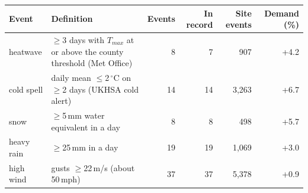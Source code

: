 \begin{tabular}{lp{6.2cm}rrrr}
\toprule
Event & Definition & Events & In record & Site events & Demand (\%) \\
\midrule
heatwave & $\geq$3 days with $T_{max}$ at or above the county threshold (Met Office) & 8 & 7 & 907 & +4.2 \\
cold spell & daily mean $\leq$2\,$^\circ$C on $\geq$2 days (UKHSA cold alert) & 14 & 14 & 3,263 & +6.7 \\
snow & $\geq$5\,mm water equivalent in a day & 8 & 8 & 498 & +5.7 \\
heavy rain & $\geq$25\,mm in a day & 19 & 19 & 1,069 & +3.0 \\
high wind & gusts $\geq$22\,m/s (about 50\,mph) & 37 & 37 & 5,378 & +0.9 \\
\bottomrule
\end{tabular}
